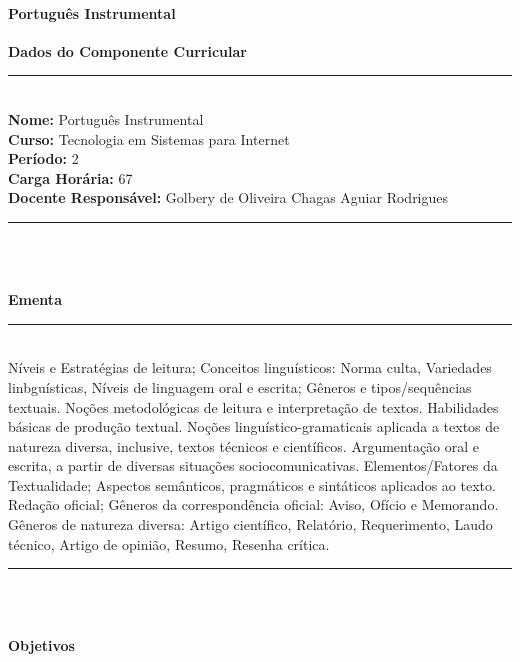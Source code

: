 \paragraph{Portugu\^es Instrumental}

\begin{center}\textbf{Dados do Componente Curricular}\end{center}
\vspace{-5mm}
\noindent\rule{16.5cm}{0.4pt}
\\
\textbf{Nome:} Portugu\^es Instrumental
\\ 
\textbf{Curso:} Tecnologia em Sistemas para Internet
\\ 
\textbf{Período:} \unit{2}{\degree}
\\ 
\textbf{Carga Horária:} \unit{67}{\hour}
\\ 
\textbf{Docente Responsável:} Golbery de Oliveira Chagas Aguiar Rodrigues
\\ 
\noindent\rule{16.5cm}{0.4pt}\\
\\
\vspace{-12mm}
\begin{center}\textbf{Ementa}\end{center}
\vspace{-5mm}
\noindent\rule{16.5cm}{0.4pt}
\\
Níveis e Estratégias de leitura; Conceitos linguísticos: Norma culta, Variedades linbguísticas, Níveis de linguagem oral e escrita; Gêneros e tipos/sequências textuais. Noções metodológicas de leitura e interpretação de textos. Habilidades básicas de produção textual. Noções linguístico-gramaticais aplicada a textos de natureza diversa, inclusive, textos técnicos e científicos. Argumentação oral e escrita, a partir de diversas situações sociocomunicativas. Elementos/Fatores da Textualidade; Aspectos semânticos, pragmáticos e sintáticos aplicados ao texto. Redação oficial; Gêneros da correspondência oficial: Aviso, Ofício e Memorando. Gêneros de natureza diversa: Artigo científico, Relatório, Requerimento, Laudo técnico, Artigo de opinião, Resumo, Resenha crítica.\\
\noindent\rule{16.5cm}{0.4pt}\\
\\
\vspace{-12mm}
\begin{center}\textbf{Objetivos}\end{center}
